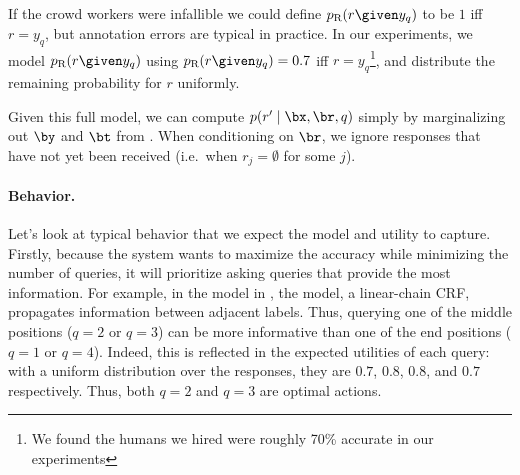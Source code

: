 %
If the crowd workers were infallible we could define $\presp(r \given y_q)$ to be $1$ iff $r = y_q$, but annotation errors are typical in practice. 
In our experiments, we model $\presp(r \given y_q)$ using $\presp(r \given y_q) = 0.7$ iff $r = y_q$\footnote{We found the humans we hired were roughly 70\% accurate in our experiments}, and distribute the remaining probability for $r$ uniformly.
%

Given this full model, we can compute $p(r' \mid \bx, \br, q)$ simply by marginalizing out $\by$ and $\bt$ from .
When conditioning on $\br$, we ignore responses that have not yet been received (i.e.\ when $r_j = \emptyset$ for some $j$).


\paragraph{Behavior.}
Let's look at typical behavior that we expect the model and utility to capture.
Firstly, because the system wants to maximize the accuracy while minimizing the number of queries, it will prioritize asking queries that provide the most information.
For example,
in the model in , the model, a linear-chain CRF, propagates information between adjacent labels. 
Thus, querying one of the middle positions ($q = 2$ or $q = 3$) can be more informative than one of the end positions ($q = 1$ or $q = 4$).
Indeed, this is reflected in the expected utilities of each query: with a uniform distribution over the responses, they are $0.7$, $0.8$, $0.8$, and $0.7$ respectively. Thus, both $q = 2$ and $q = 3$ are optimal actions. 

